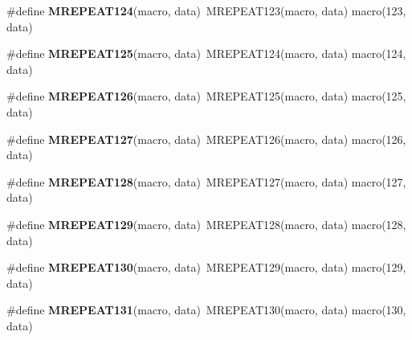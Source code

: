 \begin{DoxyCompactItemize}
\item 
\hypertarget{group__group__sam0__utils__mrepeat_gaffd8596b4b1da63e7fa64cdeb5c91dd0}{}\#define {\bfseries M\+R\+E\+P\+E\+A\+T124}(macro,  data)~M\+R\+E\+P\+E\+A\+T123(macro, data)   macro(123, data)\label{group__group__sam0__utils__mrepeat_gaffd8596b4b1da63e7fa64cdeb5c91dd0}

\item 
\hypertarget{group__group__sam0__utils__mrepeat_ga7396c439515bd5514d070147e165690a}{}\#define {\bfseries M\+R\+E\+P\+E\+A\+T125}(macro,  data)~M\+R\+E\+P\+E\+A\+T124(macro, data)   macro(124, data)\label{group__group__sam0__utils__mrepeat_ga7396c439515bd5514d070147e165690a}

\item 
\hypertarget{group__group__sam0__utils__mrepeat_ga53040b0cd4095d945f277af00a28a94d}{}\#define {\bfseries M\+R\+E\+P\+E\+A\+T126}(macro,  data)~M\+R\+E\+P\+E\+A\+T125(macro, data)   macro(125, data)\label{group__group__sam0__utils__mrepeat_ga53040b0cd4095d945f277af00a28a94d}

\item 
\hypertarget{group__group__sam0__utils__mrepeat_gaebe40c87c802115261cb83ff47e7a2e6}{}\#define {\bfseries M\+R\+E\+P\+E\+A\+T127}(macro,  data)~M\+R\+E\+P\+E\+A\+T126(macro, data)   macro(126, data)\label{group__group__sam0__utils__mrepeat_gaebe40c87c802115261cb83ff47e7a2e6}

\item 
\hypertarget{group__group__sam0__utils__mrepeat_ga932b04769d74272b98fbfe4d6c6e5f62}{}\#define {\bfseries M\+R\+E\+P\+E\+A\+T128}(macro,  data)~M\+R\+E\+P\+E\+A\+T127(macro, data)   macro(127, data)\label{group__group__sam0__utils__mrepeat_ga932b04769d74272b98fbfe4d6c6e5f62}

\item 
\hypertarget{group__group__sam0__utils__mrepeat_ga7842d9600b24d29d82636afa3f0ca4b8}{}\#define {\bfseries M\+R\+E\+P\+E\+A\+T129}(macro,  data)~M\+R\+E\+P\+E\+A\+T128(macro, data)   macro(128, data)\label{group__group__sam0__utils__mrepeat_ga7842d9600b24d29d82636afa3f0ca4b8}

\item 
\hypertarget{group__group__sam0__utils__mrepeat_ga4191567eafa92f00f44b2d84415d6364}{}\#define {\bfseries M\+R\+E\+P\+E\+A\+T130}(macro,  data)~M\+R\+E\+P\+E\+A\+T129(macro, data)   macro(129, data)\label{group__group__sam0__utils__mrepeat_ga4191567eafa92f00f44b2d84415d6364}

\item 
\hypertarget{group__group__sam0__utils__mrepeat_ga6171f95e704d4bc6b92bca58bf15445c}{}\#define {\bfseries M\+R\+E\+P\+E\+A\+T131}(macro,  data)~M\+R\+E\+P\+E\+A\+T130(macro, data)   macro(130, data)\label{group__group__sam0__utils__mrepeat_ga6171f95e704d4bc6b92bca58bf15445c}


\end{DoxyCompactItemize}
